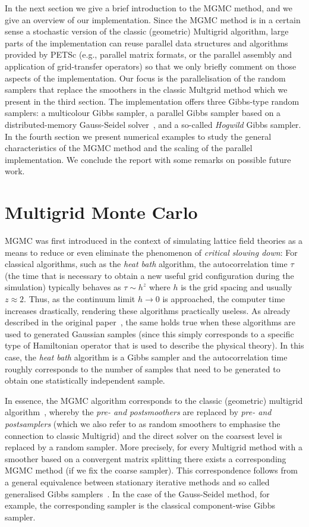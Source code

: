 \documentclass[
fontsize=11pt,
paper=a4,
numbers=noenddot
]{scrartcl}
\begin{document}
In the next section we give a brief introduction to the MGMC method, and we give an overview of our implementation. Since the MGMC method is in a certain sense a stochastic version of the classic (geometric) Multigrid algorithm, large parts of the implementation can reuse parallel data structures and algorithms provided by PETSc (e.g., parallel matrix formats, or the parallel assembly and application of grid-transfer operators) so that we only briefly comment on those aspects of the implementation. Our focus is the parallelisation of the random samplers that replace the smoothers in the classic Multgrid method which we present in the third section. The implementation offers three Gibbs-type random samplers: a multicolour Gibbs sampler, a parallel Gibbs sampler based on a distributed-memory Gauss-Seidel solver~\cite{adams2001}, and a so-called \emph{Hogwild} Gibbs sampler. In the fourth section we present numerical examples to study the general characteristics of the MGMC method and the scaling of the parallel implementation. We conclude the report with some remarks on possible future work.

\section{Multigrid Monte Carlo}
MGMC was first introduced in the context of simulating lattice field theories as a means to reduce or even eliminate the phenomenon of \emph{critical slowing down}: For classical algorithms, such as the \emph{heat bath} algorithm, the autocorrelation time $\tau$ (the time that is necessary to obtain a new useful grid configuration during the simulation) typically behaves as $\tau \sim h^z$ where $h$ is the grid spacing and usually $z \approx 2$. Thus, as the continuum limit $h \rightarrow 0$ is approached, the computer time increases drastically, rendering these algorithms practically useless. As already described in the original paper~\cite{goodmansokal}, the same holds true when these algorithms are used to generated Gaussian samples (since this simply corresponds to a specific type of Hamiltonian operator that is used to describe the physical theory). In this case, the \emph{heat bath} algorithm is a Gibbs sampler and the autocorrelation time roughly corresponds to the number of samples that need to be generated to obtain one statistically independent sample.

In essence, the MGMC algorithm corresponds to the classic (geometric) multigrid algorithm~\cite{hackbuschMultiGridMethodsApplications1985}, whereby the \emph{pre- and postsmoothers} are replaced by \emph{pre- and postsamplers} (which we also refer to as random smoothers to emphasise the connection to classic Multigrid) and the direct solver on the coarsest level is replaced by a random sampler. More precisely, for every Multigrid method with a smoother based on a convergent matrix splitting there exists a corresponding MGMC method (if we fix the coarse sampler). This correspondence follows from a general equivalence between stationary iterative methods and so called generalised Gibbs samplers~\cite{foxparker}. In the case of the Gauss-Seidel method, for example, the corresponding sampler is the classical component-wise Gibbs sampler.
\end{document}
